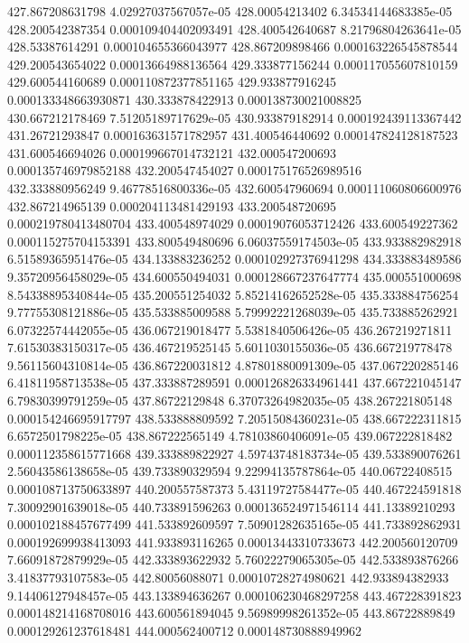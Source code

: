 {427.867208631798 4.02927037567057e-05
428.00054213402 6.34534144683385e-05
428.200542387354 0.000109404402093491
428.400542640687 8.21796804263641e-05
428.53387614291 0.000104655366043977
428.867209898466 0.000163226545878544
429.200543654022 0.00013664988136564
429.333877156244 0.000117055607810159
429.600544160689 0.000110872377851165
429.933877916245 0.000133348663930871
430.333878422913 0.000138730021008825
430.667212178469 7.51205189717629e-05
430.933879182914 0.000192439113367442
431.26721293847 0.000163631571782957
431.400546440692 0.000147824128187523
431.600546694026 0.000199667014732121
432.000547200693 0.000135746979852188
432.200547454027 0.000175176526989516
432.333880956249 9.46778516800336e-05
432.600547960694 0.000111060806600976
432.867214965139 0.000204113481429193
433.200548720695 0.000219780413480704
433.400548974029 0.00019076053712426
433.600549227362 0.000115275704153391
433.800549480696 6.06037559174503e-05
433.933882982918 6.51589365951476e-05
434.133883236252 0.000102927376941298
434.333883489586 9.35720956458029e-05
434.600550494031 0.000128667237647774
435.000551000698 8.54338895340844e-05
435.200551254032 5.85214162652528e-05
435.333884756254 9.77755308121886e-05
435.533885009588 5.79992221268039e-05
435.733885262921 6.07322574442055e-05
436.067219018477 5.5381840506426e-05
436.267219271811 7.61530383150317e-05
436.467219525145 5.6011030155036e-05
436.667219778478 9.56115604310814e-05
436.867220031812 4.87801880091309e-05
437.067220285146 6.41811958713538e-05
437.333887289591 0.000126826334961441
437.667221045147 6.79830399791259e-05
437.86722129848 6.37073264982035e-05
438.267221805148 0.000154246695917797
438.533888809592 7.20515084360231e-05
438.667222311815 6.6572501798225e-05
438.867222565149 4.78103860406091e-05
439.067222818482 0.000112358615771668
439.333889822927 4.59743748183734e-05
439.533890076261 2.56043586138658e-05
439.733890329594 9.22994135787864e-05
440.06722408515 0.000108713750633897
440.200557587373 5.43119727584477e-05
440.467224591818 7.30092901639018e-05
440.733891596263 0.000136524971546114
441.13389210293 0.000102188457677499
441.533892609597 7.50901282635165e-05
441.733892862931 0.000192699938413093
441.933893116265 0.00013443310733673
442.200560120709 7.66091872879929e-05
442.333893622932 5.76022279065305e-05
442.533893876266 3.41837793107583e-05
442.80056088071 0.00010728274980621
442.933894382933 9.14406127948457e-05
443.133894636267 0.000106230468297258
443.467228391823 0.000148214168708016
443.600561894045 9.56989998261352e-05
443.86722889849 0.000129261237618481
444.000562400712 0.000148730888949962
}
